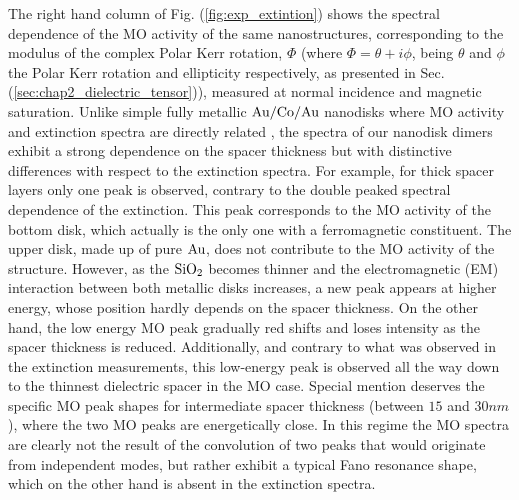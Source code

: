 The right hand column of Fig. (\ref{fig:exp_extintion}) shows the spectral dependence of the MO activity of the same nanostructures, corresponding to the modulus of the complex Polar Kerr rotation, $\Phi$ (where $\Phi = \theta + i\phi$, being $\theta$ and $\phi$ the Polar Kerr rotation and ellipticity respectively, as presented in Sec. (\ref{sec:chap2_dielectric_tensor})), measured at normal incidence and magnetic saturation. Unlike simple fully metallic $\textnormal{Au}/\textnormal{Co}/\textnormal{Au}$ nanodisks where MO activity and extinction spectra are directly related \cite{gonzalez2008plasmonic}, the spectra of our nanodisk dimers exhibit a strong dependence on the spacer thickness but with distinctive differences with respect to the extinction spectra. For example, for thick spacer layers only one peak is observed, contrary to the double peaked spectral dependence of the extinction. This peak corresponds to the MO activity of the bottom disk, which actually is the only one with a ferromagnetic constituent. The upper disk, made up of pure $\textnormal{Au}$, does not contribute to the MO activity of the structure. However, as the $\textnormal{SiO}_{2}$ becomes thinner and the electromagnetic (EM) interaction between both metallic disks increases, a new peak appears at higher energy, whose position hardly depends on the spacer thickness. On the other hand, the low energy MO peak gradually red shifts and loses intensity as the spacer thickness is reduced. Additionally, and contrary to what was observed in the extinction measurements, this low-energy peak is observed all the way down to the thinnest dielectric spacer in the MO case. Special mention deserves the specific MO peak shapes for intermediate spacer thickness (between $15$ and $30 nm$), where the two MO peaks are energetically close. In this regime the MO spectra are clearly not the result of the convolution of two peaks that would originate from independent modes, but rather exhibit a typical Fano resonance shape, which on the other hand is absent in the extinction spectra.\\
